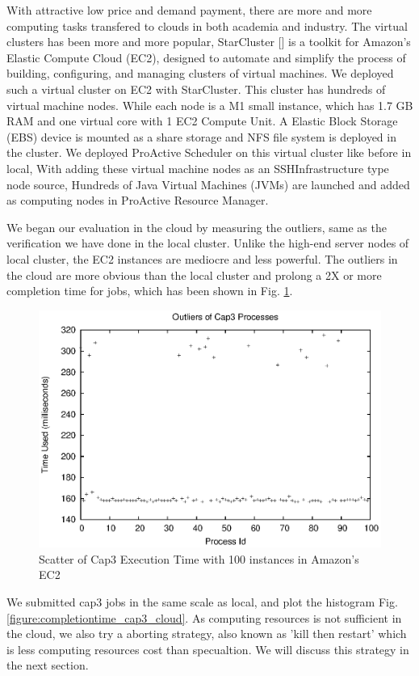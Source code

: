 With attractive low price and demand payment, there are more and more computing tasks transfered to clouds in both academia and industry. The virtual clusters has been more and more popular, StarCluster [] is a toolkit for Amazon’s Elastic Compute Cloud (EC2), designed to automate and simplify the process of building, configuring, and managing clusters of virtual machines. We deployed such a virtual cluster on EC2 with StarCluster. This cluster has hundreds of virtual machine nodes. While each node is a M1 small instance, which has 1.7 GB RAM and one virtual core with 1 EC2 Compute Unit. A Elastic Block Storage (EBS) device is mounted as a share storage and  NFS file system is deployed in the cluster. We deployed ProActive Scheduler on this virtual cluster like before in local, With adding these virtual machine nodes as an SSHInfrastructure type node source, Hundreds of Java Virtual Machines (JVMs) are launched and added as computing nodes in ProActive Resource Manager.

We began our evaluation in the cloud by measuring the outliers, same as the verification we have done in the local cluster. Unlike the high-end server nodes of local cluster, the EC2 instances are mediocre and less powerful. The outliers in the cloud are more obvious than the local cluster and prolong a 2X or more completion time for jobs, which has been shown in Fig. \ref{figure:outlier_cloud}.

\begin{figure}
\centering
\includegraphics[width=0.9\columnwidth]{figures/cloud_outliers.eps}
\caption{Scatter of Cap3 Execution Time with 100 instances in Amazon's EC2}
\label{figure:outlier_cloud}
\end{figure}

We submitted cap3 jobs in the same scale as local, and plot the histogram Fig. \ref{figure:completiontime_cap3_cloud}. As computing resources is not sufficient in the cloud, we also try a aborting strategy, also known as 'kill then restart' which is less computing resources cost than specualtion. We will discuss this strategy in the next section.

